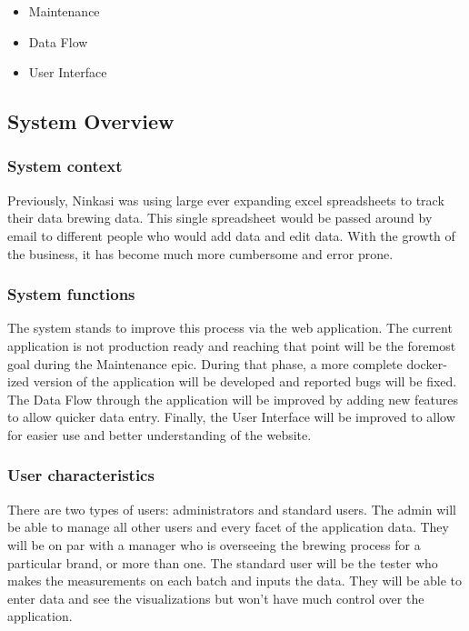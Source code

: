     \begin{itemize}
        \item Maintenance 
        \item Data Flow
        \item User Interface
    \end{itemize}
    
    \subsection{System Overview}
    
        \subsubsection{System context}
        Previously, Ninkasi was using large ever expanding excel spreadsheets to track their data brewing data.  This single spreadsheet would be passed around by email to different people who would add data and edit data. With the growth of the business, it has become much more cumbersome and error prone.
    
        \subsubsection{System functions}
        The system stands to improve this process via the web application.  The current application is not production ready and reaching that point will be the foremost goal during the Maintenance epic. During that phase, a more complete docker-ized version of the application will be developed and reported bugs will be fixed.  The Data Flow through the application will be improved by adding new features to allow quicker data entry. Finally, the User Interface will be improved to allow for easier use and better understanding of the website.
        
        \subsubsection{User characteristics}
        There are two types of users: administrators and standard users.  The admin will be able to manage all other users and every facet of the application data. They will be on par with a manager who is overseeing the brewing process for a particular brand, or more than one.  The standard user will be the tester who makes the measurements on each batch and inputs the data.  They will be able to enter data and see the visualizations but won't have much control over the application.
        
